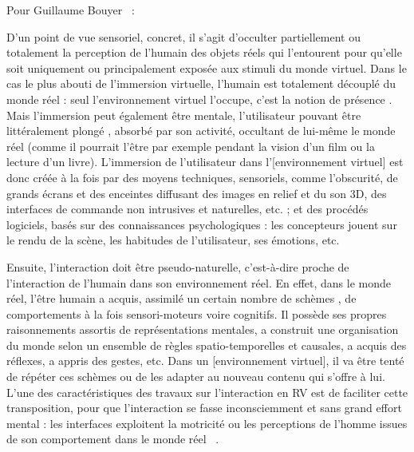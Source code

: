 	Pour Guillaume Bouyer~\cite{bouyer2007rendu} :
	
	\begin{displayquote}
	    D'un point de vue sensoriel, concret, il s'agit d'occulter partiellement ou totalement la perception de l'humain des objets réels qui l'entourent pour qu'elle soit uniquement ou principalement exposée aux stimuli du monde virtuel. Dans le cas le plus abouti de l'immersion virtuelle, l'humain est totalement découplé du monde réel : seul l'environnement virtuel l'occupe, c'est la notion de \og présence \fg{}. Mais l'immersion peut également être mentale, l'utilisateur pouvant être littéralement \og plongé \fg{}, absorbé par son activité, occultant de lui-même le monde réel (comme il pourrait l'être par exemple pendant la vision d'un film ou la lecture d'un livre). L'immersion de l'utilisateur dans l'[environnement virtuel] est donc créée à la fois par des moyens techniques, sensoriels, comme l'obscurité, de grands écrans et des enceintes diffusant des images en relief et du son 3D, des interfaces de commande non intrusives et naturelles, etc. ; et des procédés logiciels, basés sur des connaissances psychologiques : les concepteurs jouent sur le rendu de la scène, les habitudes de l'utilisateur, ses émotions, etc.
	    
	    Ensuite, l'interaction doit être pseudo-naturelle, c'est-à-dire proche de l'interaction de l'humain dans son environnement réel. En effet, dans le monde réel, l'être humain a acquis, assimilé un certain nombre de \og schèmes \fg{}, de comportements à la fois sensori-moteurs voire cognitifs. Il possède ses propres raisonnements assortis de représentations mentales, a construit une organisation du monde selon un ensemble de règles spatio-temporelles et causales, a acquis des réflexes, a appris des gestes, etc. Dans un [environnement virtuel], il va être tenté de répéter ces schèmes ou de les adapter au nouveau contenu qui s'offre à lui. L'une des caractéristiques des travaux sur l'interaction en RV est de faciliter cette transposition, pour que l'interaction se fasse inconsciemment et sans grand effort mental : \og les interfaces exploitent la motricité ou les perceptions de l'homme issues de son comportement dans le monde réel \fg{}~\cite{fuchs2006introduction}.	
	\end{displayquote}
	
